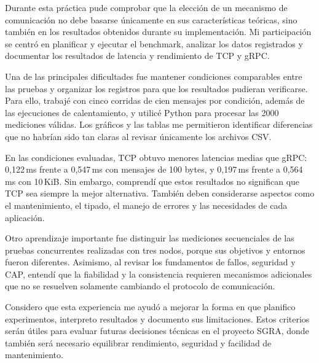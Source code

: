 Durante esta práctica pude comprobar que la elección de un mecanismo de comunicación no debe basarse únicamente en sus características teóricas, sino también en los resultados obtenidos durante su implementación. Mi participación se centró en planificar y ejecutar el benchmark, analizar los datos registrados y documentar los resultados de latencia y rendimiento de TCP y gRPC.

Una de las principales dificultades fue mantener condiciones comparables entre las pruebas y organizar los registros para que los resultados pudieran verificarse. Para ello, trabajé con cinco corridas de cien mensajes por condición, además de las ejecuciones de calentamiento, y utilicé Python para procesar las 2000 mediciones válidas. Los gráficos y las tablas me permitieron identificar diferencias que no habrían sido tan claras al revisar únicamente los archivos CSV.

En las condiciones evaluadas, TCP obtuvo menores latencias medias que gRPC: 0,122\,ms frente a 0,547\,ms con mensajes de 100 bytes, y 0,197\,ms frente a 0,564\,ms con 10\,KiB. Sin embargo, comprendí que estos resultados no significan que TCP sea siempre la mejor alternativa. También deben considerarse aspectos como el mantenimiento, el tipado, el manejo de errores y las necesidades de cada aplicación.

Otro aprendizaje importante fue distinguir las mediciones secuenciales de las pruebas concurrentes realizadas con tres nodos, porque sus objetivos y entornos fueron diferentes. Asimismo, al revisar los fundamentos de fallos, seguridad y CAP, entendí que la fiabilidad y la consistencia requieren mecanismos adicionales que no se resuelven solamente cambiando el protocolo de comunicación.

Considero que esta experiencia me ayudó a mejorar la forma en que planifico experimentos, interpreto resultados y documento sus limitaciones. Estos criterios serán útiles para evaluar futuras decisiones técnicas en el proyecto SGRA, donde también será necesario equilibrar rendimiento, seguridad y facilidad de mantenimiento.